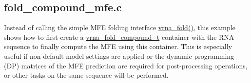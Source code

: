 \subsection*{fold\+\_\+compound\+\_\+mfe.\+c }

Instead of calling the simple M\+FE folding interface \hyperlink{group__mfe__fold__single_ga29a33b2895f4e67b0480271ff289afdc}{vrna\+\_\+fold()}, this example shows how to first create a \hyperlink{group__fold__compound_ga1b0cef17fd40466cef5968eaeeff6166}{vrna\+\_\+fold\+\_\+compound\+\_\+t} container with the R\+NA sequence to finally compute the M\+FE using this container. This is especially useful if non-\/default model settings are applied or the dynamic programming (DP) matrices of the M\+FE prediction are required for post-\/processing operations, or other tasks on the same sequence will be performed.


